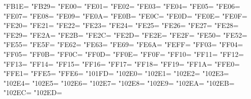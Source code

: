 \XeTeXcharclass"FB1E=\KclassNum
\XeTeXcharclass"FB29=\KclassNum
\XeTeXcharclass"FE00=\KclassNum
\XeTeXcharclass"FE01=\KclassNum
\XeTeXcharclass"FE02=\KclassNum
\XeTeXcharclass"FE03=\KclassNum
\XeTeXcharclass"FE04=\KclassNum
\XeTeXcharclass"FE05=\KclassNum
\XeTeXcharclass"FE06=\KclassNum
\XeTeXcharclass"FE07=\KclassNum
\XeTeXcharclass"FE08=\KclassNum
\XeTeXcharclass"FE09=\KclassNum
\XeTeXcharclass"FE0A=\KclassNum
\XeTeXcharclass"FE0B=\KclassNum
\XeTeXcharclass"FE0C=\KclassNum
\XeTeXcharclass"FE0D=\KclassNum
\XeTeXcharclass"FE0E=\KclassNum
\XeTeXcharclass"FE0F=\KclassNum
\XeTeXcharclass"FE20=\KclassNum
\XeTeXcharclass"FE21=\KclassNum
\XeTeXcharclass"FE22=\KclassNum
\XeTeXcharclass"FE23=\KclassNum
\XeTeXcharclass"FE24=\KclassNum
\XeTeXcharclass"FE25=\KclassNum
\XeTeXcharclass"FE26=\KclassNum
\XeTeXcharclass"FE27=\KclassNum
\XeTeXcharclass"FE28=\KclassNum
\XeTeXcharclass"FE29=\KclassNum
\XeTeXcharclass"FE2A=\KclassNum
\XeTeXcharclass"FE2B=\KclassNum
\XeTeXcharclass"FE2C=\KclassNum
\XeTeXcharclass"FE2D=\KclassNum
\XeTeXcharclass"FE2E=\KclassNum
\XeTeXcharclass"FE2F=\KclassNum
\XeTeXcharclass"FE50=\KclassNum
\XeTeXcharclass"FE52=\KclassNum
\XeTeXcharclass"FE55=\KclassNum
\XeTeXcharclass"FE5F=\KclassNum
\XeTeXcharclass"FE62=\KclassNum
\XeTeXcharclass"FE63=\KclassNum
\XeTeXcharclass"FE69=\KclassNum
\XeTeXcharclass"FE6A=\KclassNum
\XeTeXcharclass"FEFF=\KclassNum
\XeTeXcharclass"FF03=\KclassNum
\XeTeXcharclass"FF04=\KclassNum
\XeTeXcharclass"FF05=\KclassNum
\XeTeXcharclass"FF0B=\KclassNum
\XeTeXcharclass"FF0C=\KclassNum
\XeTeXcharclass"FF0D=\KclassNum
\XeTeXcharclass"FF0E=\KclassNum
\XeTeXcharclass"FF0F=\KclassNum
\XeTeXcharclass"FF10=\KclassNum
\XeTeXcharclass"FF11=\KclassNum
\XeTeXcharclass"FF12=\KclassNum
\XeTeXcharclass"FF13=\KclassNum
\XeTeXcharclass"FF14=\KclassNum
\XeTeXcharclass"FF15=\KclassNum
\XeTeXcharclass"FF16=\KclassNum
\XeTeXcharclass"FF17=\KclassNum
\XeTeXcharclass"FF18=\KclassNum
\XeTeXcharclass"FF19=\KclassNum
\XeTeXcharclass"FF1A=\KclassNum
\XeTeXcharclass"FFE0=\KclassNum
\XeTeXcharclass"FFE1=\KclassNum
\XeTeXcharclass"FFE5=\KclassNum
\XeTeXcharclass"FFE6=\KclassNum
\XeTeXcharclass"101FD=\KclassNum
\XeTeXcharclass"102E0=\KclassNum
\XeTeXcharclass"102E1=\KclassNum
\XeTeXcharclass"102E2=\KclassNum
\XeTeXcharclass"102E3=\KclassNum
\XeTeXcharclass"102E4=\KclassNum
\XeTeXcharclass"102E5=\KclassNum
\XeTeXcharclass"102E6=\KclassNum
\XeTeXcharclass"102E7=\KclassNum
\XeTeXcharclass"102E8=\KclassNum
\XeTeXcharclass"102E9=\KclassNum
\XeTeXcharclass"102EA=\KclassNum
\XeTeXcharclass"102EB=\KclassNum
\XeTeXcharclass"102EC=\KclassNum
\XeTeXcharclass"102ED=\KclassNum
